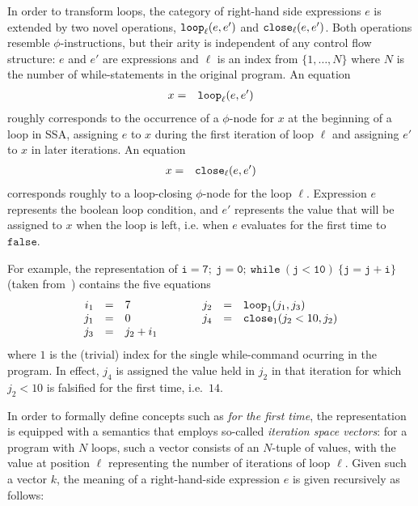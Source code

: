 In order to transform loops, the category of right-hand side
expressions $e$ is extended by two novel operations, $\mathtt{loop}_{{\ell}}({e},{e'})$ and $\mathtt{close}_{{\ell}}({e},{e'})$.
Both operations resemble $\phi$-instructions, but their arity is
independent of any control flow structure: $e$ and $e'$ are
expressions and $\ell$ is an index from $\{1,\ldots,N\}$ where $N$ is
the number of while-statements in the original program.  An equation
\begin{eqnarray*}
x & = & \mathtt{loop}_{{\ell}}({e},{e'})
\end{eqnarray*}
roughly corresponds to the occurrence of a $\phi$-node for $x$ at the
beginning of a loop in SSA, assigning $e$ to $x$ during the first
iteration of loop $\ell$ and assigning $e'$ to $x$ in later
iterations.
An equation 
\begin{eqnarray*}
x & = & \mathtt{close}_{{\ell}}({e},{e'})
\end{eqnarray*}
corresponds roughly to a loop-closing $\phi$-node for the loop
$\ell$. Expression $e$ represents the boolean loop condition, and $e'$
represents the value that will be assigned to $x$ when the loop is
left, i.e. when $e$ evaluates for the first time to $\mathtt{false}$.

For example, the representation of
$\mathtt{i=7;\ j=0;\ while\ (j<10)\ \{j=j+i\}}$
(taken from~\cite{PopJS2007}) contains the five equations
$$
\begin{array}{rclcrcl}
i_1 & = & 7 & \qquad & j_2 & = & \mathtt{loop}_{{1}}({j_1},{j_3})\\
j_1 & = & 0 & & j_4 & = & \mathtt{close}_{{1}}({j_2 < 10},{j_2})\\
j_3 & = & j_2 + i_1
\end{array} 
$$ 
where $1$ is the (trivial) index for the single while-command
ocurring in the program.  In effect, $j_4$ is assigned the value held
in $j_2$ in that iteration for which $j_2 < 10$ is falsified for the
first time, i.e.~$14$.

In order to formally define concepts such as \emph{for the first
time}, the representation is equipped with a semantics that employs
so-called
\emph{iteration space vectors}: for a program with $N$ loops, such
a vector consists of an $N$-tuple of values, with the value at
position $\ell$ representing the number of iterations of loop $\ell$.
Given such a vector $k$, the meaning of a right-hand-side expression
$e$ is given recursively as follows:

